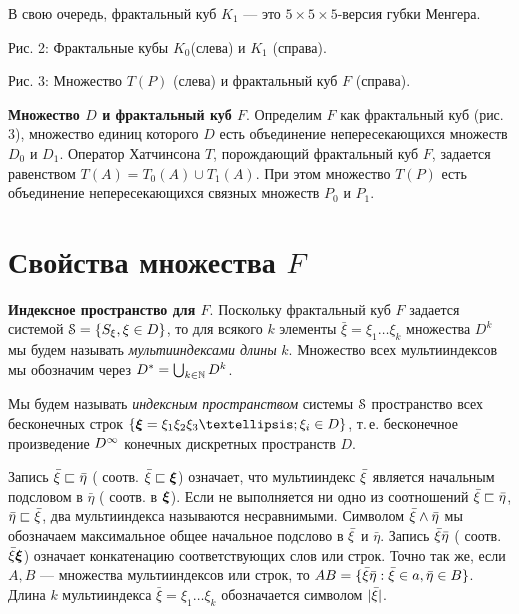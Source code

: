   В свою очередь, фрактальный куб $ K_1$ --- это $ 5\times 5\times 5 $-версия губки Менгера.



\begin{center}
{\footnotesize Рис. 2: Фрактальные кубы $K_0$(слева)  и  $K_1$ (справа).}

\begin{center}
{\footnotesize Рис. 3: Множество $T(P)$ (слева)  и фрактальный куб $F$ (справа).}
\end{center}
\end{center}


{\bf Множество $ D$ и фрактальный куб $F$}.  Определим $F$ как фрактальный куб (рис. 3), множество единиц которого  $ D$ есть объединение непересекающихся множеств $ D_0$  и  $ D_1$. Оператор Хатчинсона $T$, порождающий фрактальный куб $F$, задается равенством $T(A)=T_0(A)\cup T_1(A)$. При этом множество $T(P)$ есть объединение непересекающихся связных множеств $P_0$  и $P_1$.




\section{Свойства множества $F$}
\setcounter{equation}{0}

{\bf Индексное пространство для $F$}.
Поскольку фрактальный куб $F$ задается системой ${\EuScript S}=\{S_\xi, \xi\in D\}$, то
для всякого $k$ элементы $\bar\xi=\xi_1\ldots\xi_k$ множества $ D^k$ мы будем называть {\it мультииндексами длины} $k$.
Множество всех мультииндексов мы обозначим через $ D^*=\bigcup_{k\in\mathbb{N}} D^k$.

Мы будем называть {\em индексным пространством} системы ${\EuScript S}$  пространство всех бесконечных строк  $\{\bmx=\xi_1\xi_2\xi_3…;\xi_i\in  D\}$, т.\,е. бесконечное произведение $D^\infty$ конечных дискретных пространств $D$.

Запись ${\bar{\xi}}\sqsubset \bar\eta$ ( соотв. ${\bar{\xi}}\sqsubset {\bm{\xi}}$) означает, что
мультииндекс ${\bar{\xi}}$ является начальным подсловом в $\bar\eta$ ( соотв. в ${\bm{\xi}}$).
Если не выполняется ни одно из соотношений ${\bar{\xi}}\sqsubset \bar\eta$, $ \bar\eta\sqsubset{\bar{\xi}}$, два мультииндекса называются несравнимыми. Символом
${\bar{\xi}}\wedge \bar\eta$ мы обозначаем максимальное общее начальное подслово в
${\bar{\xi}}$  и  $\bar\eta$. Запись ${\bar{\xi}}\bar\eta$ ( соотв. ${\bar{\xi}}{\bm{\xi}}$) означает конкатенацию соответствующих слов или строк. Точно так же, если $A,B$ --- множества мультииндексов или строк, то $AB=\{{\bar{\xi}}\bar\eta: {\bar{\xi}}\in a,\bar\eta\in B\}$.   Длина $k$ мультииндекса $\bar\xi=\xi_1\ldots\xi_k$ обозначается символом $|{\bar{\xi}}|$.

